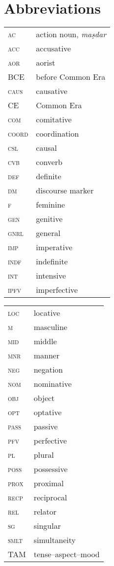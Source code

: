 \documentclass[output=paper]{langsci/langscibook}
\begin{document}
\section*{Abbreviations}
\begin{tabularx}{.5\textwidth}{@{}lQ@{}}
\textsc{ac} & action noun, \textit{maṣdar} \\
\textsc{acc} &{{accusative} }\\
\textsc{aor} & aorist \\
BCE & before Common Era \\
\textsc{caus} & {{causative} } \\
CE & Common Era \\
\textsc{com} & {{comitative} }\\
\textsc{coord} & {{coordination} }\\
\textsc{csl} & {{causal} }\\
\textsc{cvb} & {{converb} }\\
\textsc{def} & {{definite} }\\
\textsc{dm} & {{discourse marker}} \\
\textsc{f} & {{feminine} }\\
\textsc{gen} & genitive \\
\textsc{gnrl} & {{general} }\\
\textsc{imp} & {{imperative} }\\
\textsc{indf} & {{indefinite} }\\
\textsc{int} & {{intensive} }\\
\textsc{ipfv} & {{imperfective} }\\
\end{tabularx}%
\begin{tabularx}{.5\textwidth}{@{}lQ@{}}
\textsc{loc} & {{locative} }\\
\textsc{m} & {{masculine} }\\
\textsc{mid} & {{middle}}\\
\textsc{mnr} & {{manner} }\\
\textsc{neg} & {{negation} }\\
\textsc{nom} & {{nominative} }\\
\textsc{obj} & {{object} }\\
\textsc{opt} & {{optative} }\\
\textsc{pass} & {{passive} }\\
\textsc{pfv} & {{perfective} }\\
\textsc{pl} & plural \\
\textsc{poss} & {{possessive} }\\
\textsc{prox} & {{proximal} }\\
\textsc{recp} & {{reciprocal}}\\
\textsc{rel} & {{relator} }\\
\textsc{sg} & {{singular} } \\
\textsc{smlt} & {{simultaneity}} \\
TAM & {{tense--aspect--mood}}
\end{tabularx}


\sloppy
\printbibliography[heading=subbibliography,notkeyword=this]
\end{document}
